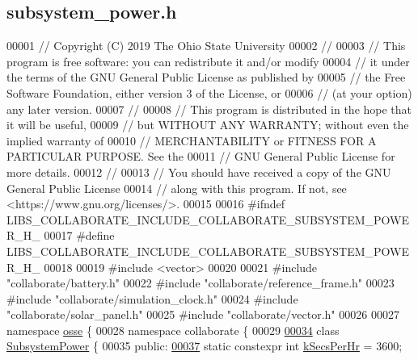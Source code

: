 \hypertarget{subsystem__power_8h_source}{}\subsection{subsystem\+\_\+power.\+h}
\label{subsystem__power_8h_source}

\begin{DoxyCode}
00001 \textcolor{comment}{// Copyright (C) 2019 The Ohio State University}
00002 \textcolor{comment}{//}
00003 \textcolor{comment}{// This program is free software: you can redistribute it and/or modify}
00004 \textcolor{comment}{// it under the terms of the GNU General Public License as published by}
00005 \textcolor{comment}{// the Free Software Foundation, either version 3 of the License, or}
00006 \textcolor{comment}{// (at your option) any later version.}
00007 \textcolor{comment}{//}
00008 \textcolor{comment}{// This program is distributed in the hope that it will be useful,}
00009 \textcolor{comment}{// but WITHOUT ANY WARRANTY; without even the implied warranty of}
00010 \textcolor{comment}{// MERCHANTABILITY or FITNESS FOR A PARTICULAR PURPOSE.  See the}
00011 \textcolor{comment}{// GNU General Public License for more details.}
00012 \textcolor{comment}{//}
00013 \textcolor{comment}{// You should have received a copy of the GNU General Public License}
00014 \textcolor{comment}{// along with this program.  If not, see <https://www.gnu.org/licenses/>.}
00015 
00016 \textcolor{preprocessor}{#ifndef LIBS\_COLLABORATE\_INCLUDE\_COLLABORATE\_SUBSYSTEM\_POWER\_H\_}
00017 \textcolor{preprocessor}{#define LIBS\_COLLABORATE\_INCLUDE\_COLLABORATE\_SUBSYSTEM\_POWER\_H\_}
00018 
00019 \textcolor{preprocessor}{#include <vector>}
00020 
00021 \textcolor{preprocessor}{#include "collaborate/battery.h"}
00022 \textcolor{preprocessor}{#include "collaborate/reference\_frame.h"}
00023 \textcolor{preprocessor}{#include "collaborate/simulation\_clock.h"}
00024 \textcolor{preprocessor}{#include "collaborate/solar\_panel.h"}
00025 \textcolor{preprocessor}{#include "collaborate/vector.h"}
00026 
00027 \textcolor{keyword}{namespace }\hyperlink{namespaceosse}{osse} \{
00028 \textcolor{keyword}{namespace }collaborate \{
00029 
\hyperlink{classosse_1_1collaborate_1_1_subsystem_power}{00034} \textcolor{keyword}{class }\hyperlink{classosse_1_1collaborate_1_1_subsystem_power}{SubsystemPower} \{
00035  \textcolor{keyword}{public}:
\hyperlink{classosse_1_1collaborate_1_1_subsystem_power_ae707a132f821afa47c5448a4d4ff98b5}{00037}   \textcolor{keyword}{static} constexpr \textcolor{keywordtype}{int} \hyperlink{classosse_1_1collaborate_1_1_subsystem_power_ae707a132f821afa47c5448a4d4ff98b5}{kSecsPerHr} = 3600;

\end{DoxyCode}
